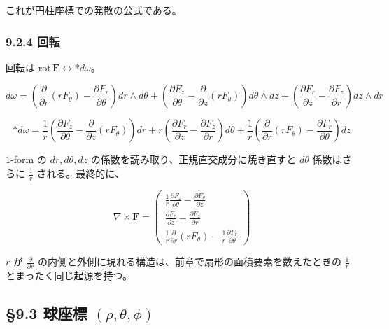 \documentclass[a4paper,12pt,openany]{book}
\begin{document}
これが円柱座標での発散の公式である。

\hypertarget{ux56deux8ee2-2}{%
\subsubsection{9.2.4 回転}\label{ux56deux8ee2-2}}

回転は \(\mathrm{rot}\,\mathbf{F} \leftrightarrow \ast d\omega\)。

\[d\omega = \left(\frac{\partial}{\partial r}(rF_\theta) - \frac{\partial F_r}{\partial\theta}\right) dr\wedge d\theta + \left(\frac{\partial F_z}{\partial\theta} - \frac{\partial}{\partial z}(rF_\theta)\right) d\theta\wedge dz + \left(\frac{\partial F_r}{\partial z} - \frac{\partial F_z}{\partial r}\right) dz\wedge dr\]

\[\ast d\omega = \frac{1}{r}\!\left(\frac{\partial F_z}{\partial\theta} - \frac{\partial}{\partial z}(rF_\theta)\right)\! dr + r\!\left(\frac{\partial F_r}{\partial z} - \frac{\partial F_z}{\partial r}\right)\! d\theta + \frac{1}{r}\!\left(\frac{\partial}{\partial r}(rF_\theta) - \frac{\partial F_r}{\partial\theta}\right)\! dz\]

\(1\)-form の \(dr, d\theta, dz\)
の係数を読み取り、正規直交成分に焼き直すと \(d\theta\) 係数はさらに
\(\frac{1}{r}\) される。最終的に、

\[\nabla \times \mathbf{F} = \begin{pmatrix}
\frac{1}{r}\frac{\partial F_z}{\partial \theta} - \frac{\partial F_\theta}{\partial z} \\[0.3em]
\frac{\partial F_r}{\partial z} - \frac{\partial F_z}{\partial r} \\[0.3em]
\frac{1}{r}\frac{\partial}{\partial r}(r F_\theta) - \frac{1}{r}\frac{\partial F_r}{\partial \theta}
\end{pmatrix}\]

\(r\) が \(\frac{\partial}{\partial r}\)
の内側と外側に現れる構造は、前章で扇形の面積要素を数えたときの
\(\frac{1}{r}\) とまったく同じ起源を持つ。

\par\vspace{0.35em}\par

\hypertarget{ux7403ux5ea7ux6a19-rhothetaphi}{%
\subsection{\texorpdfstring{§9.3 球座標
\((\rho,\theta,\phi)\)}{§9.3 球座標 (\textbackslash rho,\textbackslash theta,\textbackslash phi)}}\label{ux7403ux5ea7ux6a19-rhothetaphi}}
\end{document}

